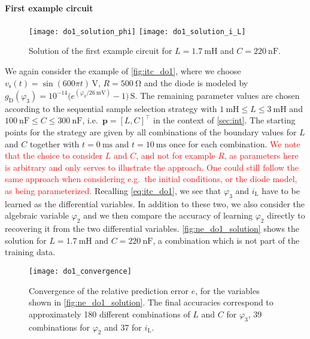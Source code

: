 \documentclass[AMA,STIX1COL]{WileyNJD-v2}
\newcommand{\mb}[1]{\mathbf{#1}}
\newcommand{\mr}[1]{\mathrm{#1}}
\newcommand{\T}{{\!\top}}
\begin{document}
\paragraph{First example circuit}
\begin{figure}[t]
    \begin{center}
        \texttt{[image: do1\_solution\_phi]} \hspace{1.5cm} \texttt{[image: do1\_solution\_i\_L]}
    \end{center}
    \caption{Solution of the first example circuit for $L = \SI{1.7}{\milli\henry}$ and $C = \SI{220}{\nano\farad}$.}
    \label{fig:ne_do1_solution}
\end{figure}
We again consider the example of \autoref{fig:itc_do1}, where we choose $v_\mr{s}(t) = \sin(600 \pi t)\, \si{\volt}$, $R = \SI{500}{\ohm}$ and the diode is modeled by $g_\mr{D}(\varphi_3) = 10^{-14} \big( e^{(\varphi_3 / \SI{26}{\mV})} - 1 \big)\, \si{\siemens}$. The remaining parameter values are chosen according to the sequential sample selection strategy with $\SI{1}{\milli\henry} \leq L \leq \SI{3}{\milli\henry}$ and $\SI{100}{\nano\farad} \leq C \leq \SI{300}{\nano\farad}$, i.e.~$\mb{p} = [L, C]^\T$ in the context of \autoref{sec:int}. The starting points for the strategy are given by all combinations of the boundary values for $L$ and $C$ together with $t = \SI{0}{\ms}$ and $t = \SI{10}{\ms}$ once for each combination. \textcolor{red}{We note that the choice to consider $L$ and $C$, and not for example $R$, as parameters here is arbitrary and only serves to illustrate the approach. One could still follow the same approach when considering e.g.~the initial conditions, or the diode model, as being parameterized.} Recalling \eqref{eq:itc_do1}, we see that $\varphi_3$ and $i_\mr{L}$ have to be learned as the differential variables. In addition to these two, we also consider the algebraic variable $\varphi_2$ and we then compare the accuracy of learning $\varphi_2$ directly to recovering it from the two differential variables. \autoref{fig:ne_do1_solution} shows the solution for $L = \SI{1.7}{\milli\henry}$ and $C = \SI{220}{\nano\farad}$, a combination which is not part of the training data.
\begin{figure}[b]
    \begin{center}
        \texttt{[image: do1\_convergence]}
    \end{center}
    \caption{Convergence of the relative prediction error $e$, for the variables shown in \autoref{fig:ne_do1_solution}. The final accuracies correspond to approximately 180 different combinations of $L$ and $C$ for $\varphi_3$, 39 combinations for $\varphi_2$ and 37 for $i_\mr{L}$.}
    \label{fig:ne_do1_convergence}
\end{figure}
\end{document}
